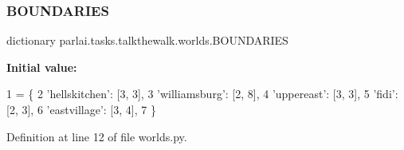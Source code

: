 \subsubsection{\texorpdfstring{B\+O\+U\+N\+D\+A\+R\+I\+ES}{BOUNDARIES}}
{\footnotesize\ttfamily dictionary parlai.\+tasks.\+talkthewalk.\+worlds.\+B\+O\+U\+N\+D\+A\+R\+I\+ES}

{\bfseries Initial value\+:}
\begin{DoxyCode}
1 =  \{
2     \textcolor{stringliteral}{'hellskitchen'}: [3, 3],
3     \textcolor{stringliteral}{'williamsburg'}: [2, 8],
4     \textcolor{stringliteral}{'uppereast'}: [3, 3],
5     \textcolor{stringliteral}{'fidi'}: [2, 3],
6     \textcolor{stringliteral}{'eastvillage'}: [3, 4],
7 \}
\end{DoxyCode}


Definition at line 12 of file worlds.\+py.

